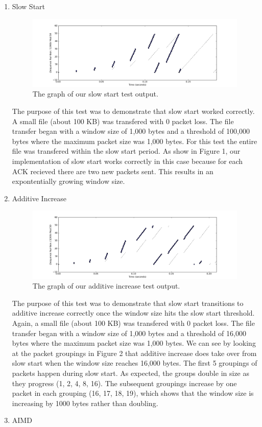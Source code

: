 \documentclass[11pt]{article}
\begin{document}
\begin{enumerate}
  \item Slow Start
  
\begin{figure}[H]
\caption{The graph of our slow start test output.}
	\label{figure1}
  	\centering
  	\includegraphics[width=\linewidth]{figure1}
\end{figure}

The purpose of this test was to demonstrate that slow start worked correctly. A small file (about 100 KB) was transfered with 0 packet loss. The file transfer began with a window size of 1,000 bytes and a threshold of 100,000 bytes where the maximum packet size was 1,000 bytes. For this test the entire file was transfered within the slow start period. As show in Figure 1, our implementation of slow start works correctly in this case because for each ACK recieved there are two new packets sent. This results in an expontentially growing window size. 
\bigskip
  \item Additive Increase
  
  \begin{figure}[H]
\caption{The graph of our additive increase test output.}
	\label{figure2}
  	\centering
  	\includegraphics[width=\linewidth]{figure2}
\end{figure}

The purpose of this test was to demonstrate that slow start transitions to additive increase correctly once the window size hits the slow start threshold. Again, a small file (about 100 KB) was transfered with 0 packet loss. The file transfer began with a window size of 1,000 bytes and a threshold of 16,000 bytes where the maximum packet size was 1,000 bytes. We can see by looking at the packet groupings in Figure 2 that additive increase does take over from slow start when the window size reaches 16,000 bytes. The first 5 groupings of packets happen during slow start. As expected, the groups double in size as they progress (1, 2, 4, 8, 16). The subsequent groupings increase by one packet in each grouping (16, 17, 18, 19), which shows that the window size is increasing by 1000 bytes rather than doubling.
\bigskip
  \item AIMD


\end{enumerate}
\end{document}
